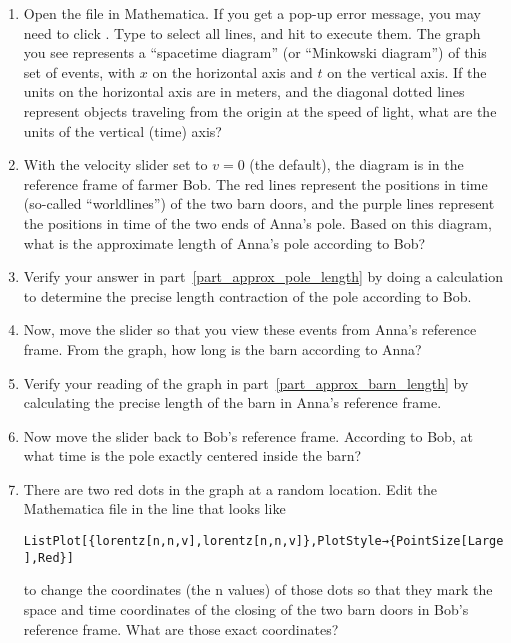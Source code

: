 \begin{enumerate}
\item Open the file  in Mathematica. If you get a pop-up error message, you may need to click . Type  to select all lines, and hit  to execute them. The graph you see represents a ``spacetime diagram'' (or ``Minkowski diagram'') of this set of events, with $x$ on the horizontal axis and $t$ on the vertical axis. If the units on the horizontal axis are in meters, and the diagonal dotted lines represent objects traveling from the origin at the speed of light, what are the units of the vertical (time) axis?
\answerspace{0.6in}

\item With the velocity slider set to $v = 0$ (the default), the diagram is in the reference frame of farmer Bob. The red lines represent the positions in time (so-called ``worldlines'') of the two barn doors, and the purple lines represent the positions in time of the two ends of Anna's pole. Based on this diagram, what is the approximate length of Anna's pole according to Bob?  \label{part_approx_pole_length}
\answerspace{0.6in}

\item Verify your answer in part~\ref{part_approx_pole_length} by doing a calculation to determine the precise length contraction of the pole according to Bob.
\answerspace{0.6in}

\item Now, move the slider so that you view these events from Anna's reference frame.
From the graph, how long is the barn according to Anna? \label{part_approx_barn_length}
\answerspace{0.6in}

\item Verify your reading of the graph in part~\ref{part_approx_barn_length} by calculating the precise length of the barn in Anna's reference frame.
\answerspace{0.6in}

\item Now move the slider back to Bob's reference frame. According to Bob, at what time is the pole exactly centered inside the barn?
\answerspace{0.6in}

\item There are two red dots in the graph at a random location. Edit the Mathematica file in the line that looks like
\begin{center}
\verb!ListPlot[{lorentz[n,n,v],lorentz[n,n,v]},PlotStyle→{PointSize[Large],Red}]!
\end{center}
to change the coordinates (the n values) of those dots so that they mark the space and time coordinates of the closing of the two barn doors in Bob's reference frame. What are those exact coordinates?
\answerspace{0.8in}


\end{enumerate}
